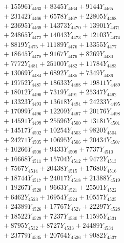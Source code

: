 \documentclass[a4paper,10pt]{article}
\begin{document}
{\begin{align}
&\;  + 15596 Y_{4463} + 8345 Y_{4464} + 9144 Y_{4465} \\[0.3ex]
&\;  + 23142 Y_{4466} + 6578 Y_{4467} + 22805 Y_{4468} \\[0.5ex]\allowbreak
&\;  + 23695 Y_{4469} + 14373 Y_{4470} + 13901 Y_{4471} \\[0.3ex]
&\;  + 24865 Y_{4472} + 14043 Y_{4473} + 12103 Y_{4474} \\[0.3ex]
&\;  + 8819 Y_{4475} + 11189 Y_{4476} + 13355 Y_{4477} \\[0.3ex]
&\;  + 18645 Y_{4478} + 9167 Y_{4479} + 8269 Y_{4480} \\[0.3ex]
&\;  + 7772 Y_{4481} + 25100 Y_{4482} + 11784 Y_{4483} \\[0.3ex]
&\;  + 13069 Y_{4484} + 6892 Y_{4485} + 7349 Y_{4486} \\[0.3ex]
&\;  + 19752 Y_{4487} + 18633 Y_{4488} + 19811 Y_{4489} \\[0.3ex]
&\;  + 18012 Y_{4490} + 7319 Y_{4491} + 25347 Y_{4492} \\[0.3ex]
&\;  + 13323 Y_{4493} + 13618 Y_{4494} + 24233 Y_{4495} \\[0.3ex]
&\;  + 17099 Y_{4496} + 12209 Y_{4497} + 20176 Y_{4498} \\[0.5ex]\allowbreak
&\;  + 14591 Y_{4499} + 25596 Y_{4500} + 13181 Y_{4501} \\[0.3ex]
&\;  + 14517 Y_{4502} + 10254 Y_{4503} + 9820 Y_{4504} \\[0.3ex]
&\;  + 24271 Y_{4505} + 10695 Y_{4506} + 20434 Y_{4507} \\[0.3ex]
&\;  + 10266 Y_{4508} + 9433 Y_{4509} + 7737 Y_{4510} \\[0.3ex]
&\;  + 16668 Y_{4511} + 15704 Y_{4512} + 9472 Y_{4513} \\[0.3ex]
&\;  + 7567 Y_{4514} + 20438 Y_{4515} + 17680 Y_{4516} \\[0.3ex]
&\;  + 18744 Y_{4517} + 24017 Y_{4518} + 21388 Y_{4519} \\[0.3ex]
&\;  + 19267 Y_{4520} + 9663 Y_{4521} + 25501 Y_{4522} \\[0.3ex]
&\;  + 6462 Y_{4523} + 16954 Y_{4524} + 10557 Y_{4525} \\[0.3ex]
&\;  + 24389 Y_{4526} + 17767 Y_{4527} + 22297 Y_{4528} \\[0.5ex]\allowbreak
&\;  + 18522 Y_{4529} + 7237 Y_{4530} + 11595 Y_{4531} \\[0.3ex]
&\;  + 8795 Y_{4532} + 8727 Y_{4533} + 24489 Y_{4534} \\[0.3ex]
&\;  + 23779 Y_{4535} + 20764 Y_{4536} + 9082 Y_{4537} \\[0.3ex]

\end{align}}
\end{document}
